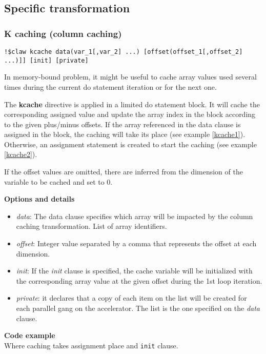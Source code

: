 \subsection{Specific transformation}
\subsubsection{K caching (column caching)}
\begin{lstlisting}
!$claw kcache data(var_1[,var_2] ...) [offset(offset_1[,offset_2] ...)]] [init] [private]
\end{lstlisting}

In memory-bound problem, it might be useful to cache array values used several
times during the current do statement iteration or for the next one.

The \textbf{kcache} directive is applied in a limited do statement block. It
will cache the corresponding assigned value and update the array index in the
block according to the given plus/minus offsets. If the array referenced in the
data clause is assigned in the block, the caching will take its place (see
example \ref{kcache1}). Otherwise, an assignment statement is created to start
the caching (see example \ref{kcache2}).

If the offset values are omitted, there are inferred from the dimension of the
variable to be cached and set to 0.

\textbf{Options and details}
\begin{itemize}
\item \textit{data}: The data clause specifies which array will be impacted by
the column caching transformation. List of array identifiers.
\item \textit{offset}: Integer value separated by a comma that represents the
offset at each dimension.
\item \textit{init}: If the \textit{init} clause is specified, the cache
variable will be initialized with the corresponding array value at the given
offset during the 1st loop iteration.
\item \textit{private}: it declares that a copy of each item on the list will
be created for each parallel gang on the accelerator. The list is the one
specified on the \textit{data} clause.
\end{itemize}

\textbf{Code example}\\
\label{kcache1}
Where caching takes assignment place and \lstinline!init! clause.

